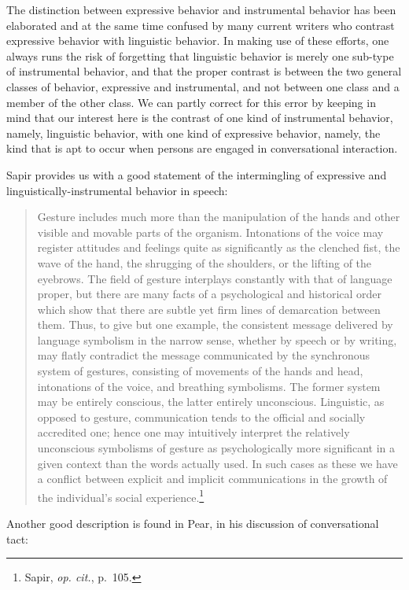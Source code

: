 \documentclass[openany,nobib]{tufte-book}
\begin{document}
\noindent The distinction between expressive behavior and instrumental behavior
has been elaborated and at the same time confused by many current
writers who contrast expressive behavior with linguistic behavior. In
making use of these efforts, one always runs the risk of forgetting that
linguistic behavior is merely one sub-type of instrumental behavior, and
that the proper contrast is between the two general classes of behavior,
expressive and instrumental, and not between one class and a member of
the other class. We can partly correct for this error by keeping in mind
that our interest here is the contrast of one kind of instrumental
behavior, namely, linguistic behavior, with one kind of expressive
behavior, namely, the kind that is apt to occur when persons are engaged
in conversational interaction.

Sapir provides us with a good statement of the intermingling of
expressive and linguistically-instrumental behavior in speech:

\begin{quote}
Gesture includes much more than the manipulation of the hands and other
visible and movable parts of the organism. Intonations of the voice may
register attitudes and feelings quite as significantly as the clenched
fist, the wave of the hand, the shrugging of the shoulders, or the
lifting of the eyebrows. The field of gesture interplays constantly with
that of language proper, but there are many facts of a psychological and
historical order which show that there are subtle yet firm lines of
demarcation between them. Thus, to give but one example, the consistent
message delivered by language symbolism in the narrow sense, whether by
speech or by writing, may flatly contradict the message communicated by
the synchronous system of gestures, consisting of movements of the hands
and head, intonations of the voice, and breathing symbolisms. The former
system may be entirely conscious, the latter entirely unconscious.
Linguistic, as opposed to gesture, communication tends to the official
and socially accredited one; hence one may intuitively interpret the
relatively unconscious symbolisms of gesture as psychologically more
significant in a given context than the words actually used. In such
cases as these we have a conflict between explicit and implicit
communications in the growth of the individual's social
experience.\footnote{Sapir, \emph{op. cit.}, p.~105.}
\end{quote}

\noindent Another good description is found in Pear, in his discussion of
conversational tact:
\end{document}
